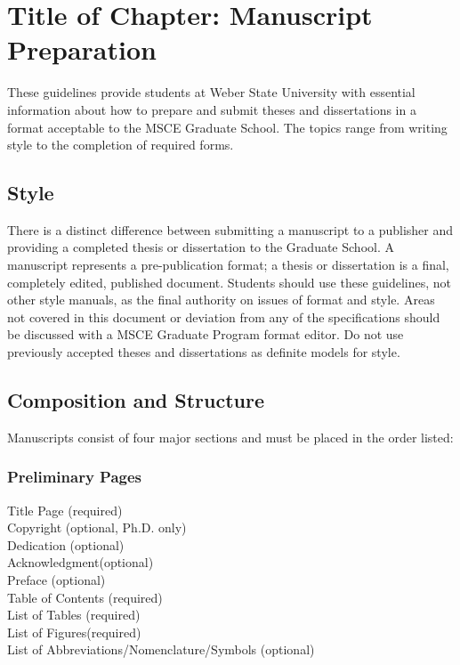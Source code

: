 

\chapter{Title of Chapter: Manuscript Preparation} \label{CH1_Introduction}
These guidelines provide students at Weber State University with essential information about how to prepare and submit theses and dissertations in a format acceptable to the MSCE Graduate School. The topics range from writing style to the completion of required forms\cite{anarticle2}. 


\section{Style}
There is a distinct difference between submitting a manuscript to a publisher and providing a completed thesis or dissertation to the Graduate School. A manuscript represents a pre-publication format; a thesis or dissertation is a final, completely edited, published document. Students should use these guidelines, not other style manuals, as the final authority on issues of format and style. Areas not covered in this document or deviation from any of the specifications should be discussed with a MSCE Graduate Program format editor. Do not use previously accepted theses and dissertations as definite models for style.

\section{Composition and Structure}
Manuscripts consist of four major sections and must be placed in the order listed:


\subsection{Preliminary Pages}
Title Page (required) \\
Copyright (optional, Ph.D. only) \\
Dedication (optional)  \\
Acknowledgment(optional) \\
Preface (optional) \\
Table of Contents (required) \\ 
List of Tables (required) \\
List of Figures(required) \\
List of Abbreviations/Nomenclature/Symbols (optional)


